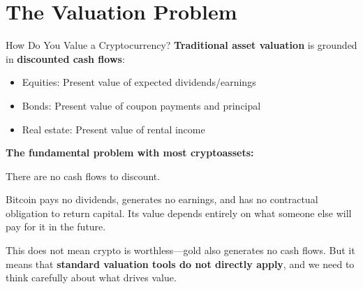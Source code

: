 \documentclass[10pt]{beamer}
\newcommand{\highlight}[1]{\textcolor{AccentOrange}{\textbf{#1}}}
\begin{document}
\section{The Valuation Problem}

\begin{frame}{How Do You Value a Cryptocurrency?}
  \textbf{Traditional asset valuation} is grounded in \highlight{discounted cash flows}:
  \begin{itemize}
    \item Equities: Present value of expected dividends/earnings
    \item Bonds: Present value of coupon payments and principal
    \item Real estate: Present value of rental income
  \end{itemize}
  
  \vspace{1em}
  \textbf{The fundamental problem with most cryptoassets:}
  
  \vspace{0.5em}
  \begin{center}
    \large There are no cash flows to discount.
  \end{center}
  
  \vspace{1em}
  Bitcoin pays no dividends, generates no earnings, and has no contractual obligation to return capital. Its value depends entirely on what someone else will pay for it in the future.
  
  \vspace{0.5em}
  This does not mean crypto is worthless---gold also generates no cash flows. But it means that \textbf{standard valuation tools do not directly apply}, and we need to think carefully about what drives value.
\end{frame}
\end{document}
